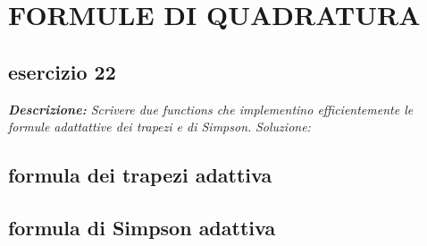 \chapter{FORMULE DI QUADRATURA}
\section{esercizio 22}
\textit{\textbf{Descrizione:}  Scrivere due functions che implementino efficientemente le formule adattattive dei trapezi e di Simpson.}\newline
\noindent\emph{Soluzione: }\newline

\section*{formula dei trapezi adattiva}

\newpage

\section*{formula di Simpson adattiva}

\newpage